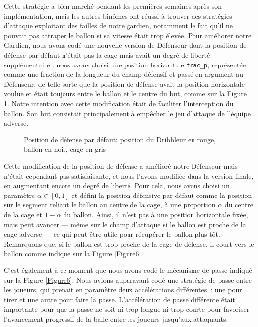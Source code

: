 \documentclass[a4paper,12pt]{article}
\begin{document}
Cette stratégie a bien marché pendant les premières semaines après son implémentation, mais les autres binômes ont réussi à trouver des stratégies d'attaque exploitant des failles de notre gardien, notamment le fait qu'il ne pouvait pas attraper le ballon si sa vitesse était trop élevée. Pour améliorer notre Gardien, nous avons codé une nouvelle version de Défenseur dont la position de défense par défaut n'était pas la cage mais avait un degré de liberté supplémentaire : nous avons choisi une position horizontale \texttt{frac\_p}, représentée comme une fraction de la longueur du champ défensif et passé en argument au Défenseur, de telle sorte que la position de défense avait la position horizontale voulue et était toujours entre le ballon et le centre du but, comme sur la Figure \ref{Figure8}. Notre intention avec cette modification était de faciliter l'interception du ballon. Son but consistait principalement à empêcher le jeu d'attaque de l'équipe adverse.

\begin{figure}[ht]
\centering

\caption{Position de défense par défaut: position du Dribbleur en rouge, ballon en noir, cage en gris}
\label{Figure8}
\end{figure}

Cette modification de la position de défense a amélioré notre Défenseur mais n'était cependant pas satisfaisante, et nous l'avons modifiée dans la version finale, en augmentant encore un degré de liberté. Pour cela, nous avons choisi un paramètre $\alpha \in [0, 1]$ et défini la position défensive par défaut comme la position sur le segment reliant le ballon au centre de la cage, à une proportion $\alpha$ du centre de la cage et $1 - \alpha$ du ballon. Ainsi, il n'est pas à une position horizontale fixée, mais peut avancer --- même sur le champ d'attaque si le ballon est proche de la cage adverse --- ce qui peut être utile pour récupérer le ballon plus tôt. Remarquons que, si le ballon est trop proche de la cage de défense, il court vers le ballon comme indique sur la Figure \ref{Figure6}.

C'est également à ce moment que nous avons codé le mécanisme de passe indiqué sur la Figure \ref{Figure6}. Nous avions auparavant codé une stratégie de passe entre les joueurs, qui prenait en paramètre deux accélérations différentes : une pour tirer et une autre pour faire la passe. L'accélération de passe différente était importante pour que la passe ne soit ni trop longue ni trop courte pour favoriser l’avancement progressif de la balle entre les joueurs jusqu’aux attaquants. 
\end{document}

